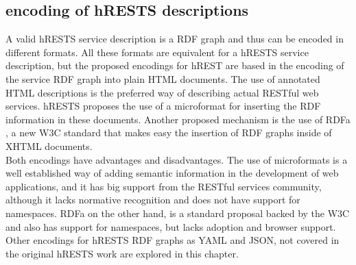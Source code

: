 \subsection{encoding of hRESTS descriptions}
A valid hRESTS service description is a RDF graph and thus can be encoded in different formats. All these formats are equivalent for a hRESTS service description, but the proposed encodings for hREST are based in the encoding of the service RDF graph into plain HTML documents. The use of annotated HTML descriptions is the preferred way of describing actual RESTful web services. hRESTS proposes the use of a microformat for inserting the RDF information in these documents. Another proposed mechanism is the use of RDFa \cite{rdfa}, a new W3C standard that makes easy the insertion of RDF graphs inside of XHTML documents.\\
Both encodings have advantages and disadvantages. The use of microformats is a well established way of adding semantic information in the development of web applications, and it has big support from the RESTful services community, although it lacks normative recognition and does not have support for namespaces. RDFa on the other hand, is a standard proposal backed by the W3C and also has support for namespaces, but lacks adoption and browser support.\\
Other encodings for hRESTS RDF graphs as YAML and JSON, not covered in the original hRESTS work are explored in this chapter.


